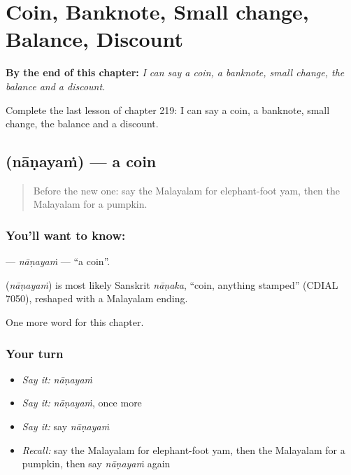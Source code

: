 
\chapter{Coin, Banknote, Small change, Balance, Discount}
\label{ch:ml-coin-banknote-small-change-balance-discount}

\begin{chapteropening}
\textbf{By the end of this chapter:} \emph{I can say a coin, a banknote, small change, the balance and a discount.}

Complete the last lesson of chapter 219: I can say a coin, a banknote, small change, the balance and a discount.
\end{chapteropening}

\section[\texorpdfstring{\ml{നാണയം} (nāṇayaṁ)}{നാണയം (nāṇayaṁ)}]{ (nāṇayaṁ) — a coin}

\label{lesson:ML-C219-nanayam}



\begin{quote}
Before the new one: say the Malayalam for elephant-foot yam, then the Malayalam for a pumpkin.
\end{quote}

\subsection*{You'll want to know: }
\textbf{} — \emph{nāṇayaṁ} — \textquotedblleft{}a coin\textquotedblright{}.

\begin{cousinweb}
\textbf{} (\emph{nāṇayaṁ}) is most likely Sanskrit \emph{nāṇaka}, \textquotedblleft{}coin, anything stamped\textquotedblright{} (CDIAL 7050), reshaped with a Malayalam ending.
\end{cousinweb}

\begin{grammarlens}[title={What you've built}]
One more word for this chapter.
\end{grammarlens}

\subsection*{Your turn}
\begin{itemize}
\raggedright
  \item \emph{Say it:} \emph{nāṇayaṁ}
  \item \emph{Say it:} \emph{nāṇayaṁ}, once more
  \item \emph{Say it:} say \emph{nāṇayaṁ}
  \item \emph{Recall:} say the Malayalam for elephant-foot yam, then the Malayalam for a pumpkin, then say \emph{nāṇayaṁ} again
\end{itemize}

